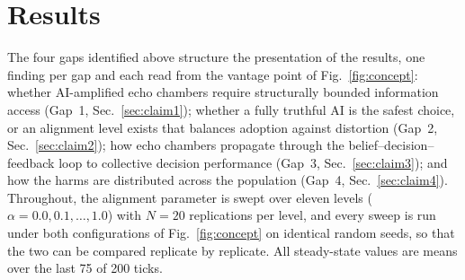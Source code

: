 \documentclass[pdflatex,sn-nature]{sn-jnl}
\begin{document}
\section{Results}\label{sec:results}

The four gaps identified above structure the presentation of the results, one finding per gap and each read from the vantage point of Fig.~\ref{fig:concept}: whether AI-amplified echo chambers require structurally bounded information access (Gap~1, Sec.~\ref{sec:claim1}); whether a fully truthful AI is the safest choice, or an alignment level exists that balances adoption against distortion (Gap~2, Sec.~\ref{sec:claim2}); how echo chambers propagate through the belief--decision--feedback loop to collective decision performance (Gap~3, Sec.~\ref{sec:claim3}); and how the harms are distributed across the population (Gap~4, Sec.~\ref{sec:claim4}). Throughout, the alignment parameter is swept over eleven levels ($\alpha = 0.0, 0.1, \ldots, 1.0$) with $N = 20$ replications per level, and every sweep is run under both configurations of Fig.~\ref{fig:concept} on identical random seeds, so that the two can be compared replicate by replicate. All steady-state values are means over the last 75 of 200 ticks.
\end{document}
